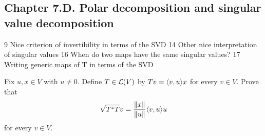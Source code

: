 \subsection*{Chapter 7.D. Polar decomposition and singular value decomposition}

9 Nice criterion of invertibility in terms of the SVD 
14 Other nice interpretation of singular values 
16 When do two maps have the same singular values?
17 Writing generic maps of T in terms of the SVD


\begin{exercise}{1}
  Fix $u,x\in V$ with $u\neq 0$. Define $T\in\mathcal{L}(V)$ by $Tv =\langle v,u\rangle x$ for every $v\in V$. Prove that
  \[
  \sqrt{T^\ast T}v=\frac{\left\lVert x\right\rVert}{\left\lVert u\right\rVert}\langle v,u\rangle u
  \]
  for every $v\in V$.
\end{exercise}
